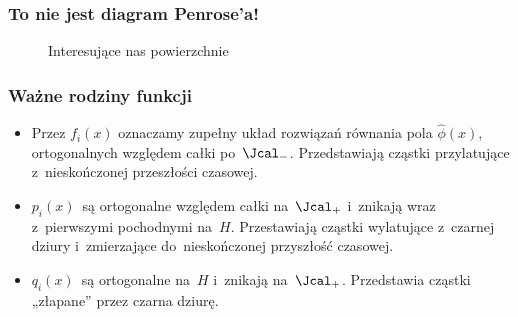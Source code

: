 \documentclass[10pt,t]{beamer}
\begin{document}
\begin{frame}
  \frametitle{To nie jest diagram Penrose’a!}


  \begin{figure}[h]

    \centering


    \caption{Interesujące nas powierzchnie}

  \end{figure}

\end{frame}





\begin{frame}
  \frametitle{Ważne rodziny funkcji}


  \begin{itemize}

  \item Przez $f_{ i }( x )$ oznaczamy zupełny układ rozwiązań
    równania pola $\widehat{ \phi }( x )$, ortogonalnych względem
    całki po~$\Jcal_{ - }$. Przedstawiają cząstki przylatujące
    z~nieskończonej przeszłości czasowej.

  \item $p_{ i }( x )$~są ortogonalne względem całki
    na~$\Jcal_{ + }$ i~znikają wraz z~pierwszymi pochodnymi
    na~$H$. Przestawiają cząstki wylatujące z~czarnej dziury
    i~zmierzające do~nieskończonej przyszłość czasowej.

  \item $q_{ i }( x )$~są ortogonalne na~$H$ i~znikają
    na~$\Jcal_{ + }$. Przedstawia cząstki „złapane” przez czarna
    dziurę.

  \end{itemize}

\end{frame}
\end{document}
